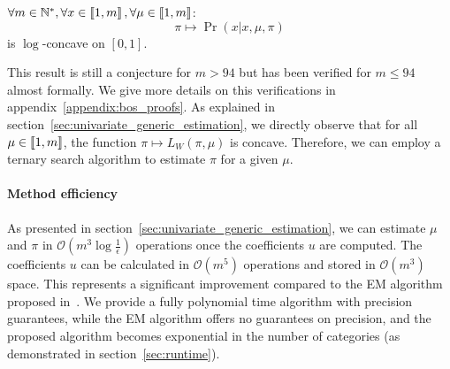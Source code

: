 \begin{conjecture}
    $\forall m \in \mathbb{N}^*, \forall x \in \left\llbracket1, m\right\rrbracket, \forall \mu \in \left\llbracket1, m\right\rrbracket$:
    \[\pi \mapsto \Pr(x | x, \mu, \pi) \] 
    is $\log$-concave on $[0, 1]$.
\end{conjecture}

This result is still a conjecture for $m > 94$ but has been verified for $m \leq 94$ almost formally. We give more details on this verifications in appendix~\ref{appendix:bos_proofs}.
As explained in section~\ref{sec:univariate_generic_estimation}, we directly observe that for all $\mu \in \left\llbracket1, m\right\rrbracket$, the function $\pi \mapsto L_W(\pi, \mu)$ is concave. Therefore, we can employ a ternary search algorithm to estimate $\pi$ for a given $\mu$.

\paragraph{Method efficiency}

As presented in section~\ref{sec:univariate_generic_estimation}, we can estimate $\mu$ and $\pi$ in $\mathcal O(m^3 \log \frac{1}{\epsilon})$ operations once the coefficients $u$ are computed. The coefficients $u$ can be calculated in $\mathcal O(m^5)$ operations and stored in $\mathcal O(m^3)$ space. This represents a significant improvement compared to the EM algorithm proposed in~\cite{biernacki2016model}. We provide a fully polynomial time algorithm with precision guarantees, while the EM algorithm offers no guarantees on precision, and the proposed algorithm becomes exponential in the number of categories (as demonstrated in section~\ref{sec:runtime}).




